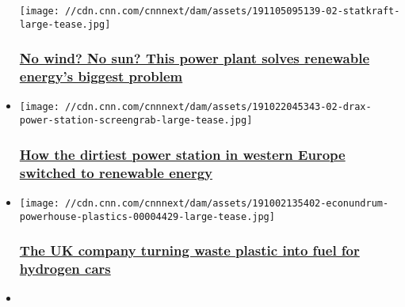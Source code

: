 \begin{itemize}
  \texttt{[image: //cdn.cnn.com/cnnnext/dam/assets/191105095139-02-statkraft-large-tease.jpg]}

  \hypertarget{no-wind-no-sun-this-power-plant-solves-renewable-energys-biggest-problem}{%
  \subsubsection{\texorpdfstring{\href{/2019/11/07/business/statkraft-virtual-power-plant/index.html}{No
  wind? No sun? This power plant solves renewable energy's biggest
  problem}}{No wind? No sun? This power plant solves renewable energy's biggest problem}}\label{no-wind-no-sun-this-power-plant-solves-renewable-energys-biggest-problem}}
\item
  \href{/2019/10/23/business/drax-power-station/index.html}{}

  \texttt{[image: //cdn.cnn.com/cnnnext/dam/assets/191022045343-02-drax-power-station-screengrab-large-tease.jpg]}

  \hypertarget{how-the-dirtiest-power-station-in-western-europe-switched-to-renewable-energy}{%
  \subsubsection{\texorpdfstring{\href{/2019/10/23/business/drax-power-station/index.html}{How
  the dirtiest power station in western Europe switched to renewable
  energy}}{How the dirtiest power station in western Europe switched to renewable energy}}\label{how-the-dirtiest-power-station-in-western-europe-switched-to-renewable-energy}}
\item
  \href{/2019/10/14/energy/powerhouse-energy-plastic-hydrogen/index.html}{}

  \texttt{[image: //cdn.cnn.com/cnnnext/dam/assets/191002135402-econundrum-powerhouse-plastics-00004429-large-tease.jpg]}

  \hypertarget{the-uk-company-turning-waste-plastic-into-fuel-for-hydrogen-cars}{%
  \subsubsection{\texorpdfstring{\href{/2019/10/14/energy/powerhouse-energy-plastic-hydrogen/index.html}{The
  UK company turning waste plastic into fuel for hydrogen
  cars}}{The UK company turning waste plastic into fuel for hydrogen cars}}\label{the-uk-company-turning-waste-plastic-into-fuel-for-hydrogen-cars}}
\item
  \href{/2019/07/29/business/daimler-electric-trucks/index.html}{}


\end{itemize}
